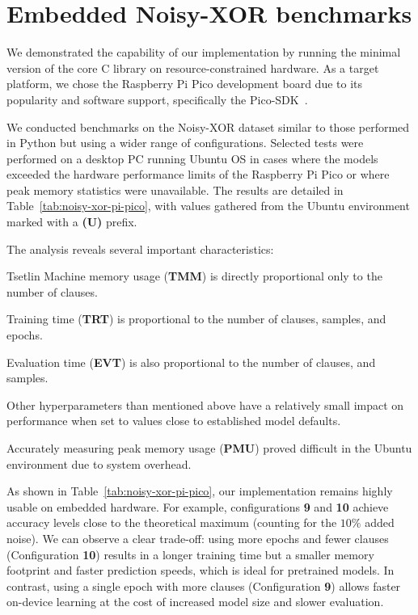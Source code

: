 \documentclass[english]{aghengthesis} %
\begin{document}
\section{Embedded Noisy-XOR benchmarks}
We demonstrated the capability of our implementation by running the minimal version of the core C library on resource-constrained hardware. As a target platform, we chose the Raspberry Pi Pico development board due to its popularity and software support, specifically the Pico-SDK~\cite{pico-sdk}.

We conducted benchmarks on the Noisy-XOR dataset similar to those performed in Python but using a wider range of configurations. Selected tests were performed on a desktop PC running Ubuntu OS in cases where the models exceeded the hardware performance limits of the Raspberry Pi Pico or where peak memory statistics were unavailable. The results are detailed in Table~\ref{tab:noisy-xor-pi-pico}, with values gathered from the Ubuntu environment marked with a \textbf{(U)} prefix.

The analysis reveals several important characteristics:
\begin{compactitem}
    \item Tsetlin Machine memory usage (\textbf{TMM}) is directly proportional only to the number of clauses.
    \item Training time (\textbf{TRT}) is proportional to the number of clauses, samples, and epochs.
    \item Evaluation time (\textbf{EVT}) is also proportional to the number of clauses, and samples.
    \item Other hyperparameters than mentioned above have a relatively small impact on performance when set to values close to established model defaults.
    \item Accurately measuring peak memory usage (\textbf{PMU}) proved difficult in the Ubuntu environment due to system overhead.
\end{compactitem}

As shown in Table~\ref{tab:noisy-xor-pi-pico}, our implementation remains highly usable on embedded hardware. For example, configurations \textbf{9} and \textbf{10} achieve accuracy levels close to the theoretical maximum (counting for the $10\%$ added noise). We can observe a clear trade-off: using more epochs and fewer clauses (Configuration \textbf{10}) results in a longer training time but a smaller memory footprint and faster prediction speeds, which is ideal for pretrained models. In contrast, using a single epoch with more clauses (Configuration \textbf{9}) allows faster on-device learning at the cost of increased model size and slower evaluation.
\end{document}
